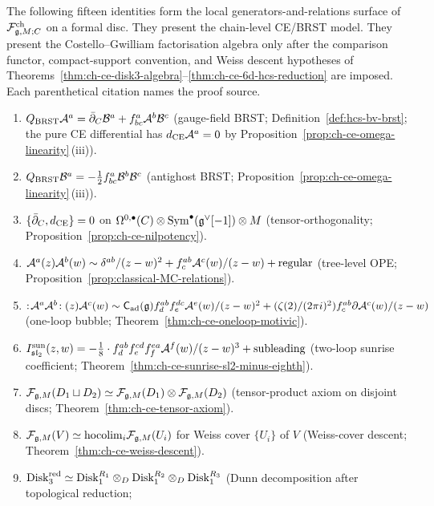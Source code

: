 The following fifteen identities form the local
generators-and-relations surface of $\mathcal{F}^{\mathrm{ch}}_{\mathfrak{g},M;C}$ on a
formal disc. They present the chain-level CE/BRST model. They present
the Costello--Gwilliam factorisation algebra only after the comparison
functor, compact-support convention, and Weiss descent hypotheses of
Theorems~\ref{thm:ch-ce-disk3-algebra}--\ref{thm:ch-ce-6d-hcs-reduction}
are imposed. Each parenthetical citation names the proof source.

\begin{enumerate}[label=\textup{(I\arabic*)},ref=I\arabic*]
\item\label{id:01}
$Q_{\mathrm{BRST}}\mathcal{A}^a = \bar\partial_C\mathcal{B}^a + f^a_{bc}\mathcal{A}^b\mathcal{B}^c$
(gauge-field BRST; Definition~\ref{def:hcs-bv-brst}; the pure CE
differential has $d_{\mathrm{CE}}\mathcal{A}^a=0$ by
Proposition~\ref{prop:ch-ce-omega-linearity}\,(iii)).
\item\label{id:02}
$Q_{\mathrm{BRST}}\mathcal{B}^a = -\tfrac12 f^a_{bc}\mathcal{B}^b\mathcal{B}^c$
(antighost BRST; Proposition~\ref{prop:ch-ce-omega-linearity}\,(iii)).
\item\label{id:03}
$\{\bar\partial_C, d_{\mathrm{CE}}\} = 0$ on
$\Omega^{0,\bullet}(C)\otimes\mathrm{Sym}^\bullet(\mathfrak{g}^\vee[-1])\otimes M$
(tensor-orthogonality; Proposition~\ref{prop:ch-ce-nilpotency}).
\item\label{id:04}
$\mathcal{A}^a(z)\mathcal{A}^b(w)\sim\delta^{ab}/(z-w)^2 + f^{ab}_c\mathcal{A}^c(w)/(z-w)
+ \mathrm{regular}$
(tree-level OPE; Proposition~\ref{prop:classical-MC-relations}).
\item\label{id:05}
$:\!\mathcal{A}^a\mathcal{A}^b\!:(z)\mathcal{A}^c(w)\sim\mathsf C_{\mathrm{ad}}(\mathfrak{g})
f^{ab}_d f^{dc}_e\mathcal{A}^e(w)/(z-w)^2 + (\zeta(2)/(2\pi i)^2) f^{ab}_c
\partial\mathcal{A}^c(w)/(z-w)$
(one-loop bubble; Theorem~\ref{thm:ch-ce-oneloop-motivic}).
\item\label{id:06}
$I^{\mathrm{sun}}_{\mathfrak{sl}_2}(z,w) = -\tfrac18\cdot f^{ab}_d f^{cd}_e
f^{ea}_f\mathcal{A}^f(w)/(z-w)^3 + \mathrm{subleading}$
(two-loop sunrise coefficient; Theorem~\ref{thm:ch-ce-sunrise-sl2-minus-eighth}).
\item\label{id:07}
$\mathcal{F}_{\mathfrak{g},M}(D_1\sqcup D_2)\simeq\mathcal{F}_{\mathfrak{g},M}(D_1)\otimes\mathcal{F}_{\mathfrak{g},M}(D_2)$
(tensor-product axiom on disjoint discs;
Theorem~\ref{thm:ch-ce-tensor-axiom}).
\item\label{id:08}
$\mathcal{F}_{\mathfrak{g},M}(V) \simeq \mathrm{hocolim}_i\mathcal{F}_{\mathfrak{g},M}(U_i)$ for Weiss cover
$\{U_i\}$ of $V$
(Weiss-cover descent; Theorem~\ref{thm:ch-ce-weiss-descent}).
\item\label{id:09}
$\mathrm{Disk}_3^{\mathrm{red}}\simeq
\mathrm{Disk}_1^{R_1}\otimes_D\mathrm{Disk}_1^{R_2}\otimes_D\mathrm{Disk}_1^{R_3}$
(Dunn decomposition after topological reduction;

\end{enumerate}

